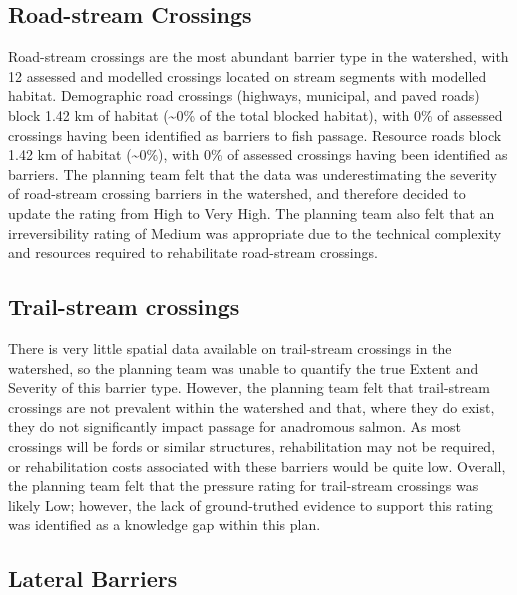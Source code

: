 \documentclass[
  letterpaper,
  DIV=11,
  numbers=noendperiod]{scrreprt}
\begin{document}
\subsection*{Road-stream Crossings}\label{road-stream-crossings}

Road-stream crossings are the most abundant barrier type in the
watershed, with 12 assessed and modelled crossings located on stream
segments with modelled habitat. Demographic road crossings (highways,
municipal, and paved roads) block 1.42 km of habitat (\textasciitilde0\%
of the total blocked habitat), with 0\% of assessed crossings having
been identified as barriers to fish passage. Resource roads block 1.42
km of habitat (\textasciitilde0\%), with 0\% of assessed crossings
having been identified as barriers. The planning team felt that the data
was underestimating the severity of road-stream crossing barriers in the
watershed, and therefore decided to update the rating from High to Very
High. The planning team also felt that an irreversibility rating of
Medium was appropriate due to the technical complexity and resources
required to rehabilitate road-stream crossings.

\subsection*{Trail-stream crossings}\label{trail-stream-crossings}

There is very little spatial data available on trail-stream crossings in
the watershed, so the planning team was unable to quantify the true
Extent and Severity of this barrier type. However, the planning team
felt that trail-stream crossings are not prevalent within the watershed
and that, where they do exist, they do not significantly impact passage
for anadromous salmon. As most crossings will be fords or similar
structures, rehabilitation may not be required, or rehabilitation costs
associated with these barriers would be quite low. Overall, the planning
team felt that the pressure rating for trail-stream crossings was likely
Low; however, the lack of ground-truthed evidence to support this rating
was identified as a knowledge gap within this plan.

\subsection*{Lateral Barriers}\label{lateral-barriers}
\end{document}
